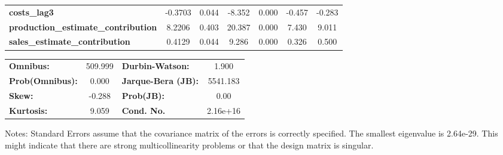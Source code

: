 \begin{center}
\begin{tabular}{lcccccc}
\textbf{costs\_lag3}                        &      -0.3703  &        0.044     &    -8.352  &         0.000        &       -0.457    &       -0.283     \\
\textbf{production\_estimate\_contribution} &       8.2206  &        0.403     &    20.387  &         0.000        &        7.430    &        9.011     \\
\textbf{sales\_estimate\_contribution}      &       0.4129  &        0.044     &     9.286  &         0.000        &        0.326    &        0.500     \\
\bottomrule
\end{tabular}
\begin{tabular}{lclc}
\textbf{Omnibus:}       & 509.999 & \textbf{  Durbin-Watson:     } &    1.900  \\
\textbf{Prob(Omnibus):} &   0.000 & \textbf{  Jarque-Bera (JB):  } & 5541.183  \\
\textbf{Skew:}          &  -0.288 & \textbf{  Prob(JB):          } &     0.00  \\
\textbf{Kurtosis:}      &   9.059 & \textbf{  Cond. No.          } & 2.16e+16  \\
\bottomrule
\end{tabular}
\end{center}

Notes: \newline
 [1] Standard Errors assume that the covariance matrix of the errors is correctly specified. \newline
 [2] The smallest eigenvalue is 2.64e-29. This might indicate that there are \newline
 strong multicollinearity problems or that the design matrix is singular.